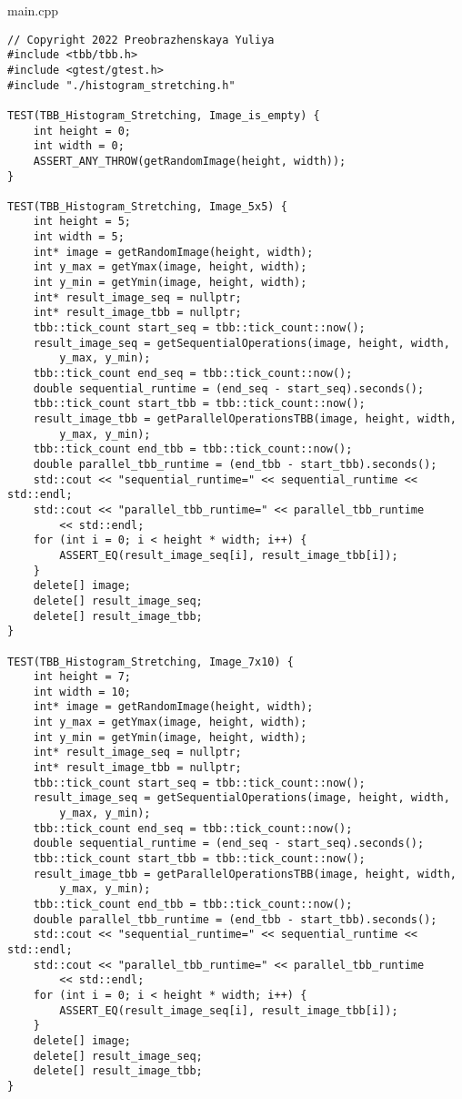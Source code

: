 \documentclass{report}
\begin{document}
main.cpp
\begin{lstlisting}
// Copyright 2022 Preobrazhenskaya Yuliya
#include <tbb/tbb.h>
#include <gtest/gtest.h>
#include "./histogram_stretching.h"

TEST(TBB_Histogram_Stretching, Image_is_empty) {
    int height = 0;
    int width = 0;
    ASSERT_ANY_THROW(getRandomImage(height, width));
}

TEST(TBB_Histogram_Stretching, Image_5x5) {
    int height = 5;
    int width = 5;
    int* image = getRandomImage(height, width);
    int y_max = getYmax(image, height, width);
    int y_min = getYmin(image, height, width);
    int* result_image_seq = nullptr;
    int* result_image_tbb = nullptr;
    tbb::tick_count start_seq = tbb::tick_count::now();
    result_image_seq = getSequentialOperations(image, height, width,
        y_max, y_min);
    tbb::tick_count end_seq = tbb::tick_count::now();
    double sequential_runtime = (end_seq - start_seq).seconds();
    tbb::tick_count start_tbb = tbb::tick_count::now();
    result_image_tbb = getParallelOperationsTBB(image, height, width,
        y_max, y_min);
    tbb::tick_count end_tbb = tbb::tick_count::now();
    double parallel_tbb_runtime = (end_tbb - start_tbb).seconds();
    std::cout << "sequential_runtime=" << sequential_runtime << std::endl;
    std::cout << "parallel_tbb_runtime=" << parallel_tbb_runtime
        << std::endl;
    for (int i = 0; i < height * width; i++) {
        ASSERT_EQ(result_image_seq[i], result_image_tbb[i]);
    }
    delete[] image;
    delete[] result_image_seq;
    delete[] result_image_tbb;
}

TEST(TBB_Histogram_Stretching, Image_7x10) {
    int height = 7;
    int width = 10;
    int* image = getRandomImage(height, width);
    int y_max = getYmax(image, height, width);
    int y_min = getYmin(image, height, width);
    int* result_image_seq = nullptr;
    int* result_image_tbb = nullptr;
    tbb::tick_count start_seq = tbb::tick_count::now();
    result_image_seq = getSequentialOperations(image, height, width,
        y_max, y_min);
    tbb::tick_count end_seq = tbb::tick_count::now();
    double sequential_runtime = (end_seq - start_seq).seconds();
    tbb::tick_count start_tbb = tbb::tick_count::now();
    result_image_tbb = getParallelOperationsTBB(image, height, width,
        y_max, y_min);
    tbb::tick_count end_tbb = tbb::tick_count::now();
    double parallel_tbb_runtime = (end_tbb - start_tbb).seconds();
    std::cout << "sequential_runtime=" << sequential_runtime << std::endl;
    std::cout << "parallel_tbb_runtime=" << parallel_tbb_runtime
        << std::endl;
    for (int i = 0; i < height * width; i++) {
        ASSERT_EQ(result_image_seq[i], result_image_tbb[i]);
    }
    delete[] image;
    delete[] result_image_seq;
    delete[] result_image_tbb;
}


\end{lstlisting}
\end{document}
